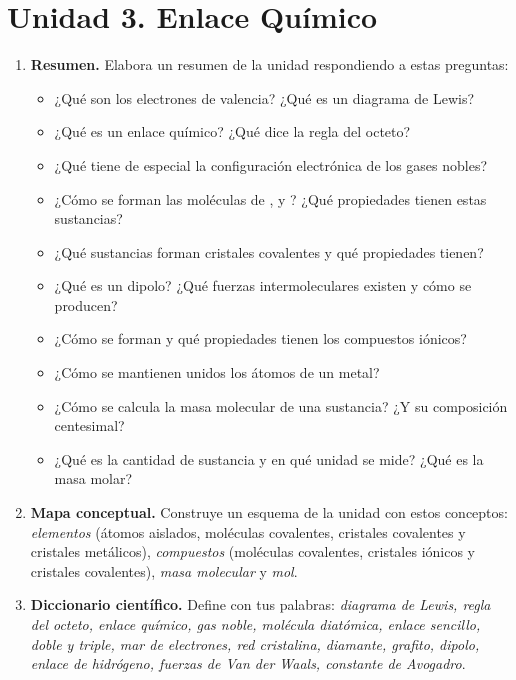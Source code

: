 \section{Unidad 3. Enlace Químico}

\begin{enumerate}[label=\numberballred]
    \item \textbf{Resumen.} Elabora un resumen de la unidad respondiendo a estas preguntas:
    \begin{itemize}
        \item ¿Qué son los electrones de valencia? ¿Qué es un diagrama de Lewis?
        \item ¿Qué es un enlace químico? ¿Qué dice la regla del octeto?
        \item ¿Qué tiene de especial la configuración electrónica de los gases nobles?
        \item ¿Cómo se forman las moléculas de ,  y ? ¿Qué propiedades tienen estas sustancias?
        \item ¿Qué sustancias forman cristales covalentes y qué propiedades tienen?
        \item ¿Qué es un dipolo? ¿Qué fuerzas intermoleculares existen y cómo se producen?
        \item ¿Cómo se forman y qué propiedades tienen los compuestos iónicos?
        \item ¿Cómo se mantienen unidos los átomos de un metal?
        \item ¿Cómo se calcula la masa molecular de una sustancia? ¿Y su composición centesimal?
        \item ¿Qué es la cantidad de sustancia y en qué unidad se mide? ¿Qué es la masa molar?
    \end{itemize}
    \item \textbf{Mapa conceptual.} Construye un esquema de la unidad con estos conceptos: \emph{elementos} (átomos aislados, moléculas covalentes, cristales covalentes y cristales metálicos), \emph{compuestos} (moléculas covalentes, cristales iónicos y cristales covalentes), \emph{masa molecular} y \emph{mol}.
    \item \textbf{Diccionario científico.} Define con tus palabras: \emph{diagrama de Lewis, regla del octeto, enlace químico, gas noble, molécula diatómica, enlace sencillo, doble y triple, mar de electrones, red cristalina, diamante, grafito, dipolo, enlace de hidrógeno, fuerzas de Van der Waals, constante de Avogadro}.
\end{enumerate}

